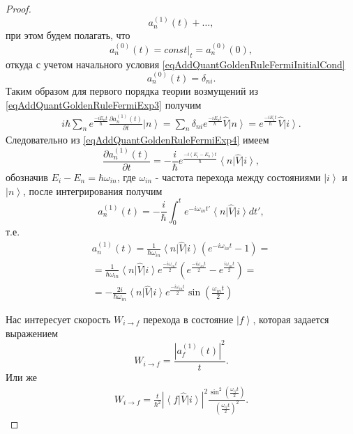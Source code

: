 \begin{proof}
\begin{equation}
    a_n^{(1)}\left(t\right) + \dots,    
    \nonumber
  \end{equation}
  при этом будем полагать, что
  \[
  a_n^{(0)}\left(t\right) = \left.const\right|_t = a_n^{(0)}\left(0\right),
  \]
  откуда с учетом начального условия
  \eqref{eqAddQuantGoldenRuleFermiInitialCond}
  \[
  a_n^{(0)}\left(t\right) = \delta_{ni}.
  \]
  Таким образом для первого порядка теории возмущений из
  \eqref{eqAddQuantGoldenRuleFermiExp3} получим
  \begin{eqnarray}
    i \hbar \sum_n  e^{\frac{-i E_n t}{\hbar}}
    \frac{ \partial a_n^{(1)}\left(t\right)}{\partial t } \left|n\right> =
     \sum_n  \delta_{ni} 
     e^{\frac{-i E_n t}{\hbar}} \hat{V} \left|n\right> =
     e^{\frac{-i E_i t}{\hbar}} \hat{V} \left|i\right>.
    \label{eqAddQuantGoldenRuleFermiExp4}
  \end{eqnarray}
  Следовательно из \eqref{eqAddQuantGoldenRuleFermiExp4} имеем
  \begin{equation}
    \frac{ \partial a_n^{(1)}\left(t\right)}{\partial t }  =
    - \frac{i}{\hbar} e^{\frac{-i \left(E_i - E_n\right) t}{\hbar}}
    \left<n\right|\hat{V}\left|i\right>,
    \nonumber
  \end{equation}
  обозначив $E_i - E_n = \hbar \omega_{in}$, где $\omega_{in}$ -
  частота перехода между состояниями $\left|i\right>$ и
  $\left|n\right>$, после интегрирования получим
  \begin{equation}
  a_n^{(1)}\left(t\right)  =
    - \frac{i}{\hbar} \int_0^t e^{-i \omega_{in} t'}
    \left<n\right|\hat{V}\left|i\right> dt',
    \nonumber
  \end{equation}
  т.е.
  \begin{eqnarray}
  a_n^{(1)}\left(t\right)  =
  \frac{1}{\hbar \omega_{in}} \left<n\right|\hat{V}\left|i\right>
  \left(e^{-i \omega_{in} t} -  1\right) =
  \\ \nonumber =
  \frac{1}{\hbar \omega_{in}} \left<n\right|\hat{V}\left|i\right>
  e^{\frac{-i \omega_{in} t}{2}}
  \left(e^{\frac{-i \omega_{in} t}{2}} -  e^{\frac{i \omega_{in}
      t}{2}}\right) =
  \\ \nonumber
  =
  - \frac{2 i}{\hbar \omega_{in}} \left<n\right|\hat{V}\left|i\right>
  e^{\frac{-i \omega_{in} t}{2}}
  \sin\left(\frac{ \omega_{in} t}{2}\right)
  \nonumber
  \end{eqnarray}
  
  
  Нас интересует скорость $W_{i \rightarrow f}$ перехода в
  состояние $\left|f\right>$, которая задается выражением
  \[
  W_{i \rightarrow f} = \frac{\left|a_f^{(1)}\left(t\right)\right|^2}{t}.
  \]
  Или же
  \begin{eqnarray}
    W_{i \rightarrow f} =
    \frac{t}{\hbar^2}
    \left|\left<f\right|\hat{V}\left|i\right>\right|^2
    \frac{\sin^2\left(\frac{ \omega_{if} t}{2}\right)}
         {\left(\frac{ \omega_{if} t}{2}\right)^2}.
    \label{eqAddQuantGoldenRuleFermiExp5}
  \end{eqnarray}


\end{proof}
